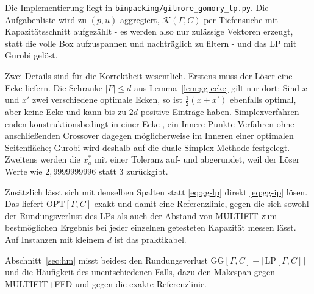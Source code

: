 Die Implementierung liegt in \texttt{binpacking/gilmore\_gomory\_lp.py}.
Die Aufgabenliste wird zu $(p, u)$ aggregiert, $\mathcal{K}(\Gamma, C)$ per Tiefensuche mit
Kapazitätsschnitt aufgezählt - es werden also nur zulässige Vektoren erzeugt, statt die volle
Box aufzuspannen und nachträglich zu filtern - und das LP mit Gurobi gelöst.

Zwei Details sind für die Korrektheit wesentlich.
Erstens muss der Löser eine Ecke liefern.
Die Schranke $|F| \le d$ aus Lemma~\ref{lem:gg-ecke} gilt nur dort: Sind $x$ und $x'$ zwei
verschiedene optimale Ecken, so ist $\tfrac{1}{2}(x + x')$ ebenfalls optimal, aber keine Ecke und
kann bis zu $2d$ positive Einträge haben.
Simplexverfahren enden konstruktionsbedingt in einer Ecke \cite[Anh.~A]{williamson_shmoys2011}, ein Innere-Punkte-Verfahren ohne
anschließenden Crossover dagegen möglicherweise im Inneren einer optimalen Seitenfläche; Gurobi
wird deshalb auf die duale Simplex-Methode festgelegt.
Zweitens werden die $x^\ast_a$ mit einer Toleranz auf- und abgerundet, weil der Löser Werte wie
$2{,}9999999996$ statt $3$ zurückgibt.

Zusätzlich lässt sich mit denselben Spalten statt \eqref{eq:gg-lp} direkt \eqref{eq:gg-ip} lösen.
Das liefert $\mathrm{OPT}[\Gamma, C]$ exakt und damit eine Referenzlinie, gegen die sich sowohl
der Rundungsverlust des LPs als auch der Abstand von MULTIFIT zum bestmöglichen Ergebnis bei
jeder einzelnen getesteten Kapazität messen lässt.
Auf Instanzen mit kleinem $d$ ist das praktikabel.

Abschnitt~\ref{sec:hm} misst beides: den Rundungsverlust
$\mathrm{GG}[\Gamma,C] - \lceil\mathrm{LP}[\Gamma,C]\rceil$ und die Häufigkeit des
unentschiedenen Falls, dazu den Makespan gegen MULTIFIT+FFD und gegen die exakte
Referenzlinie.
